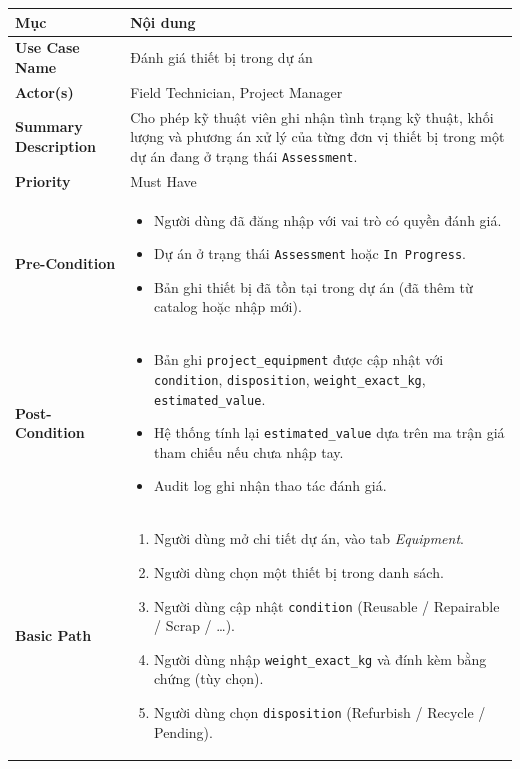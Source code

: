 \begin{xltabular}{\textwidth}{|>{\bfseries}p{4.5cm}|X|}
    \hline
    \textbf{Mục} & \textbf{Nội dung} \\
    \hline
    Use Case Name & Đánh giá thiết bị trong dự án \\
    \hline
    Actor(s) & Field Technician, Project Manager \\
    \hline
    Summary Description & Cho phép kỹ thuật viên ghi nhận tình trạng kỹ thuật, khối lượng và phương án xử lý của từng đơn vị thiết bị trong một dự án đang ở trạng thái \texttt{Assessment}. \\
    \hline
    Priority & Must Have \\
    \hline
    Pre-Condition &
    \begin{itemize}[leftmargin=*, nosep]
        \item Người dùng đã đăng nhập với vai trò có quyền đánh giá.
        \item Dự án ở trạng thái \texttt{Assessment} hoặc \texttt{In Progress}.
        \item Bản ghi thiết bị đã tồn tại trong dự án (đã thêm từ catalog hoặc nhập mới).
    \end{itemize} \\
    \hline
    Post-Condition &
    \begin{itemize}[leftmargin=*, nosep]
        \item Bản ghi \texttt{project\_equipment} được cập nhật với \texttt{condition}, \texttt{disposition}, \texttt{weight\_exact\_kg}, \texttt{estimated\_value}.
        \item Hệ thống tính lại \texttt{estimated\_value} dựa trên ma trận giá tham chiếu nếu chưa nhập tay.
        \item Audit log ghi nhận thao tác đánh giá.
    \end{itemize} \\
    \hline
    Basic Path &
    \begin{enumerate}[leftmargin=*, nosep]
        \item Người dùng mở chi tiết dự án, vào tab \emph{Equipment}.
        \item Người dùng chọn một thiết bị trong danh sách.
        \item Người dùng cập nhật \texttt{condition} (Reusable / Repairable / Scrap / \dots).
        \item Người dùng nhập \texttt{weight\_exact\_kg} và đính kèm bằng chứng (tùy chọn).
        \item Người dùng chọn \texttt{disposition} (Refurbish / Recycle / Pending).

\end{enumerate}
\end{xltabular}
